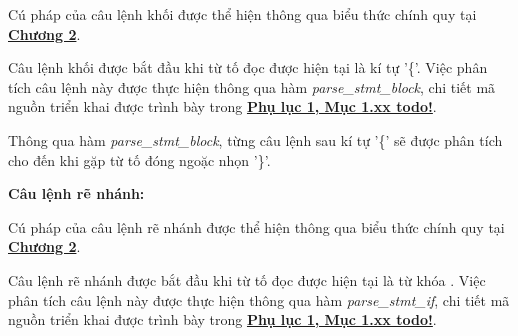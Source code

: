Cú pháp của câu lệnh khối được thể hiện thông qua biểu thức chính quy tại \hyperref[ch2:block_stmt]{\bf Chương 2}.

Câu lệnh khối được bắt đầu khi từ tố đọc được hiện tại là kí tự '\{'. Việc phân tích câu lệnh này được thực hiện thông qua hàm \textit{parse\_stmt\_block}, chi tiết mã nguồn triển khai được trình bày trong \hyperref[ap1:simple_token]{\bf Phụ lục 1, Mục 1.xx todo!}.

        
Thông qua hàm \textit{parse\_stmt\_block}, từng câu lệnh sau kí tự '\{' sẽ được phân tích cho đến khi gặp từ tố đóng ngoặc nhọn '\}'.



\textbf{Câu lệnh rẽ nhánh:} 

Cú pháp của câu lệnh rẽ nhánh được thể hiện thông qua biểu thức chính quy tại \hyperref[ch2:if_stmt]{\bf Chương 2}.

Câu lệnh rẽ nhánh được bắt đầu khi từ tố đọc được hiện tại là từ khóa . Việc phân tích câu lệnh này được thực hiện thông qua hàm \textit{parse\_stmt\_if}, chi tiết mã nguồn triển khai được trình bày trong \hyperref[ap1:simple_token]{\bf Phụ lục 1, Mục 1.xx todo!}.
        
        
